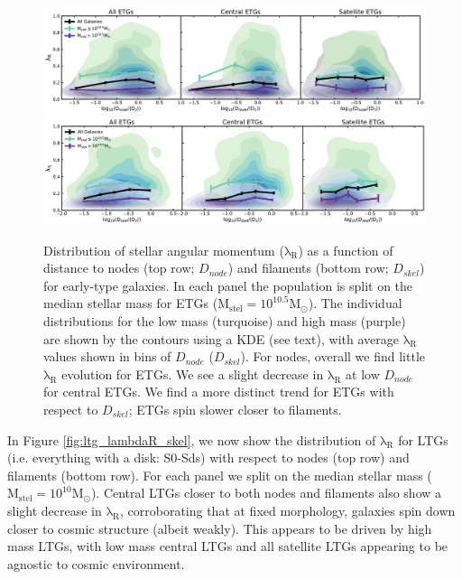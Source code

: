 \begin{figure}
    \centering\includegraphics[width=\linewidth]{thesis/latex/cw_spin/etg_lambdaR_dnode_mass_split_3sigma.pdf} \\
    \centering\includegraphics[width=\linewidth]{thesis/latex/cw_spin/etg_lambdaR_dskel_mass_split_3sigma.pdf}
    \caption{Distribution of stellar angular momentum ($\mathrm{\lambda_R}$) as a function of distance to nodes (top row; $D_{node}$) and filaments (bottom row; $D_{skel}$) for early-type galaxies. In each panel the population is split on the median stellar mass for ETGs ($\mathrm{M_{stel} = 10^{10.5}M_{\odot}}$). The individual distributions for the low mass (turquoise) and high mass (purple) are shown by the contours using a KDE (see text), with average $\mathrm{\lambda_R}$ values shown in bins of $D_{node}$ ($D_{skel}$). For nodes, overall we find little $\mathrm{\lambda_R}$ evolution for ETGs. We see a slight decrease in $\mathrm{\lambda_R}$ at low $D_{node}$ for central ETGs. We find a more distinct trend for ETGs with respect to $D_{skel}$; ETGs spin slower closer to filaments.}
\label{fig:etg_lambdaR_skel}
\end{figure} 

In Figure \ref{fig:ltg_lambdaR_skel}, we now show the distribution of $\mathrm{\lambda_R}$ for LTGs (i.e. everything with a disk: S0-Sds) with respect to nodes (top row) and filaments (bottom row). For each panel we split on the median stellar mass ($\mathrm{M_{stel} = 10^{10}M_{\odot}}$). Central LTGs closer to both nodes and filaments also show a slight decrease in $\mathrm{\lambda_R}$, corroborating that at fixed morphology, galaxies spin down closer to cosmic structure (albeit weakly). This appears to be driven by high mass LTGs, with low mass central LTGs and all satellite LTGs appearing to be agnostic to cosmic environment. 

